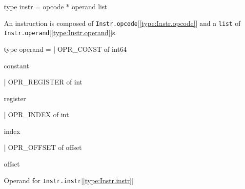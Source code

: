 \documentclass[11pt]{article}
\begin{document}
\label{type:Instr.instr}\begin{ocamldoccode}
type instr = opcode * operand list 
\end{ocamldoccode}
\begin{ocamldocdescription}
An instruction is composed of {\tt{Instr.opcode}}[\ref{type:Instr.opcode}] and a {\tt{list}} of {\tt{Instr.operand}}[\ref{type:Instr.operand}]s.


\end{ocamldocdescription}




\label{type:Instr.operand}\begin{ocamldoccode}
type operand =
  | OPR_CONST of int64
\end{ocamldoccode}
\begin{ocamldoccomment}
constant
\end{ocamldoccomment}
\begin{ocamldoccode}
  | OPR_REGISTER of int
\end{ocamldoccode}
\begin{ocamldoccomment}
register
\end{ocamldoccomment}
\begin{ocamldoccode}
  | OPR_INDEX of int
\end{ocamldoccode}
\begin{ocamldoccomment}
index
\end{ocamldoccomment}
\begin{ocamldoccode}
  | OPR_OFFSET of offset
\end{ocamldoccode}
\begin{ocamldoccomment}
offset
\end{ocamldoccomment}
\begin{ocamldocdescription}
Operand for {\tt{Instr.instr}}[\ref{type:Instr.instr}]


\end{ocamldocdescription}
\end{document}
